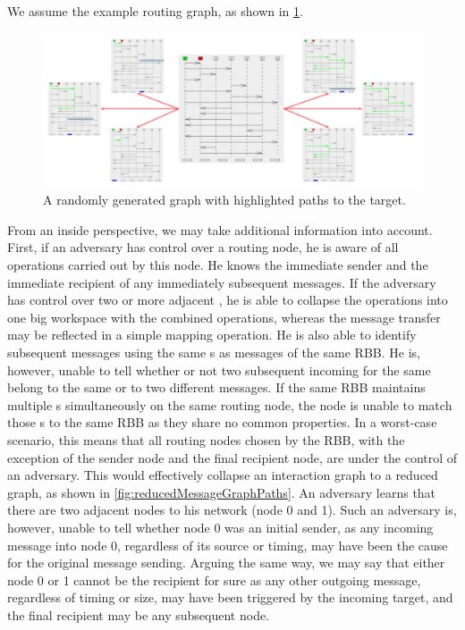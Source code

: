 We assume the example routing graph, as shown in \cref{fig:messageGraphPaths}.

\begin{figure}[!t]\centering
	\includegraphics[width=1\textwidth]{inc/messageGraphPaths}
	\caption{A randomly generated graph with highlighted paths to the target.}
	\label{fig:messageGraphPaths}
\end{figure}


From an inside perspective, we may take additional information into account. First, if an adversary has control over a routing node, he is aware of all operations carried out by this node. He knows the immediate sender and the immediate recipient of any immediately subsequent messages. If the adversary has control over two or more adjacent \VortexNodes{}, he is able to collapse the operations into one big workspace with the combined operations, whereas the message transfer may be reflected in a simple mapping operation. He is also able to identify subsequent messages using the same s as messages of the same RBB. He is, however, unable to tell whether or not two subsequent incoming \VortexMessages{} for the same  belong to the same or to two different messages. If the same RBB maintains multiple s simultaneously on the same routing node, the node is unable to match those s to the same RBB as they share no common properties. In a worst-case scenario, this means that all routing nodes chosen by the RBB, with the exception of the sender node and the final recipient node,  are under the control of an adversary. This would effectively collapse an interaction graph to a reduced graph, as shown in \cref{fig:reducedMessageGraphPaths}. An adversary learns that there are two adjacent nodes to his network (node 0 and 1). Such an adversary is, however, unable to tell whether node 0 was an initial sender, as any incoming message into node 0, regardless of its source or timing, may have been the cause for the original message sending. Arguing the same way, we may say that either node 0 or 1 cannot be the recipient for sure as any other outgoing message, regardless of timing or size, may have been triggered by the incoming target, and the final recipient may be any subsequent node.

